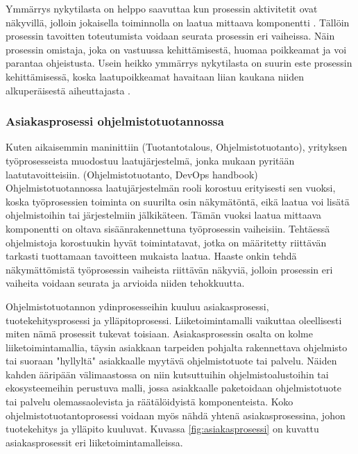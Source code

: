 \documentclass[finnish,12pt,a4paper,pdftex]{article}
\begin{document}
Ymmärrys nykytilasta on helppo saavuttaa kun prosessin aktivitetit ovat näkyvillä, jolloin jokaisella toiminnolla on laatua mittaava komponentti \citep{ohjelmistotuotanto}. Tällöin prosessin tavoitten toteutumista voidaan seurata prosessin eri vaiheissa. Näin prosessin omistaja, joka on vastuussa kehittämisestä, huomaa poikkeamat ja voi parantaa ohjeistusta. Usein heikko ymmärrys nykytilasta on suurin este prosessin kehittämisessä, koska laatupoikkeamat havaitaan liian kaukana niiden alkuperäisestä aiheuttajasta \citep{teollisuustalous}.

\subsubsection{Asiakasprosessi ohjelmistotuotannossa}

Kuten aikaisemmin maninittiin (Tuotantotalous, Ohjelmistotuotanto), yrityksen työprosesseista muodostuu laatujärjestelmä, jonka mukaan pyritään laatutavoitteisiin. (Ohjelmistotuotanto, DevOps handbook) Ohjelmistotuotannossa laatujärjestelmän rooli korostuu erityisesti sen vuoksi, koska työprosessien toiminta on suurilta osin näkymätöntä, eikä laatua voi lisätä ohjelmistoihin tai järjestelmiin jälkikäteen. Tämän vuoksi laatua mittaava komponentti on oltava sisäänrakennettuna työprosessin vaiheisiin. Tehtäessä ohjelmistoja korostuukin hyvät toimintatavat, jotka on määritetty riittävän tarkasti tuottamaan tavoitteen mukaista laatua. Haaste onkin tehdä näkymättömistä työprosessin vaiheista riittävän näkyviä, jolloin prosessin eri vaiheita voidaan seurata ja arvioida niiden tehokkuutta. 

Ohjelmistotuotannon ydinprosesseihin kuuluu asiakasprosessi, tuotekehitysprosessi ja ylläpitoprosessi. Liiketoimintamalli vaikuttaa oleellisesti miten nämä prosessit tukevat toisiaan. Asiakasprosessin osalta on kolme liiketoimintamallia, täysin asiakkaan tarpeiden pohjalta rakennettava ohjelmisto tai suoraan "hyllyltä" asiakkaalle myytävä ohjelmistotuote tai palvelu. Näiden kahden ääripään välimaastossa on niin kutsuttuihin ohjelmistoalustoihin tai ekosysteemeihin perustuva malli, jossa asiakkaalle paketoidaan ohjelmistotuote tai palvelu olemassaolevista ja räätälöidyistä komponenteista. Koko ohjelmistotuotantoprosessi voidaan myös nähdä yhtenä asiakasprosessina, johon tuotekehitys ja ylläpito kuuluvat. Kuvassa \ref{fig:asiakasprosessi} on kuvattu asiakasprosessit eri liiketoimintamalleissa.
\end{document}
